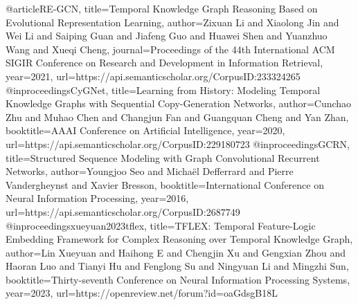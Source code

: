 @article{RE-GCN,
  title={Temporal Knowledge Graph Reasoning Based on Evolutional Representation Learning},
  author={Zixuan Li and Xiaolong Jin and Wei Li and Saiping Guan and Jiafeng Guo and Huawei Shen and Yuanzhuo Wang and Xueqi Cheng},
  journal={Proceedings of the 44th International ACM SIGIR Conference on Research and Development in Information Retrieval},
  year={2021},
  url={https://api.semanticscholar.org/CorpusID:233324265}
}
@inproceedings{CyGNet,
  title={Learning from History: Modeling Temporal Knowledge Graphs with Sequential Copy-Generation Networks},
  author={Cunchao Zhu and Muhao Chen and Changjun Fan and Guangquan Cheng and Yan Zhan},
  booktitle={AAAI Conference on Artificial Intelligence},
  year={2020},
  url={https://api.semanticscholar.org/CorpusID:229180723}
}
@inproceedings{GCRN,
  title={Structured Sequence Modeling with Graph Convolutional Recurrent Networks},
  author={Youngjoo Seo and Micha{\"e}l Defferrard and Pierre Vandergheynst and Xavier Bresson},
  booktitle={International Conference on Neural Information Processing},
  year={2016},
  url={https://api.semanticscholar.org/CorpusID:2687749}
}
@inproceedings{xueyuan2023tflex,
  title={{TFLEX}: Temporal Feature-Logic Embedding Framework for Complex Reasoning over Temporal Knowledge Graph},
  author={Lin Xueyuan and Haihong E and Chengjin Xu and Gengxian Zhou and Haoran Luo and Tianyi Hu and Fenglong Su and Ningyuan Li and Mingzhi Sun},
  booktitle={Thirty-seventh Conference on Neural Information Processing Systems},
  year={2023},
  url={https://openreview.net/forum?id=oaGdsgB18L}
}